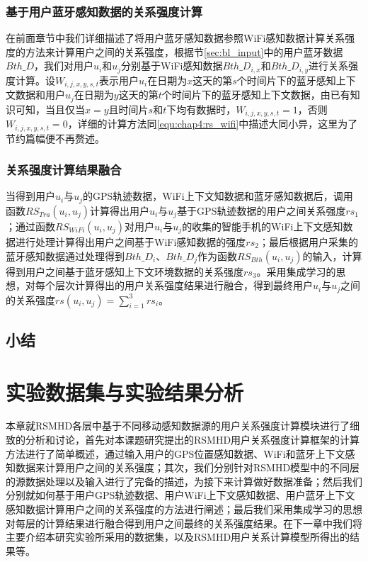 \subsection{基于用户蓝牙感知数据的关系强度计算}
在前面章节中我们详细描述了将用户蓝牙感知数据参照WiFi感知数据计算关系强度的方法来计算用户之间的关系强度，根据节\ref{sec:bl_input}中的用户蓝牙数据$Bth\_D$，我们对用户$u_{i}$和$u_{j}$分别基于WiFi感知数据$Bth\_D_{i,x}$和$Bth\_D_{i,y}$进行关系强度计算。设$W_{i,j,x,y,s,t}$表示用户$u_{i}$在日期为$x$这天的第$s$个时间片下的蓝牙感知上下文数据和用户$u_{j}$在日期为$y$这天的第$t$个时间片下的蓝牙感知上下文数据，由已有知识可知，当且仅当$x=y$且时间片$s$和$t$下均有数据时，$W_{i,j,x,y,s,t}=1$，否则$W_{i,j,x,y,s,t}=0$，详细的计算方法同\ref{equ:chap4:rs_wifi}中描述大同小异，这里为了节约篇幅便不再赘述。
\subsection{关系强度计算结果融合}
当得到用户$u_{i}$与$u_{j}$的GPS轨迹数据，WiFi上下文知数据和蓝牙感知数据后，调用函数$RS_{Tra}(u_{i},u_{j})$计算得出用户$u_{i}$与$u_{j}$基于GPS轨迹数据的用户之间关系强度$rs_{1}$；通过函数$RS_{WiFi}(u_{i},u_{j})$对用户$u_{i}$与$u_{j}$的收集的智能手机的WiFi上下文感知数据进行处理计算得出用户之间基于WiFi感知数据的强度$rs_{2}$；最后根据用户采集的蓝牙感知数据通过处理得到$Bth\_D_{i}$、$Bth\_D_{j}$作为函数$RS_{Bth}(u_{i},u_{j})$的输入，计算得到用户之间基于蓝牙感知上下文环境数据的关系强度$rs_{3}$。采用集成学习的思想，对每个层次计算得出的用户关系强度结果进行融合，得到最终用户$u_{i}$与$u_{j}$之间的关系强度$rs(u_{i},u_{j})=\sum_{i=1}^{3}rs_{i}$。
\clearpage
\section{小结}
\label{sec:section4-4}
\chapter{实验数据集与实验结果分析}
\label{chap:chapter03}
本章就RSMHD各层中基于不同移动感知数据源的用户关系强度计算模块进行了细致的分析和讨论，首先对本课题研究提出的RSMHD用户关系强度计算框架的计算方法进行了简单概述，通过输入用户的GPS位置感知数据、WiFi和蓝牙上下文感知数据来计算用户之间的关系强度；其次，我们分别针对RSMHD模型中的不同层的源数据处理以及输入进行了完备的描述，为接下来计算做好数据准备；然后我们分别就如何基于用户GPS轨迹数据、用户WiFi上下文感知数据、用户蓝牙上下文感知数据计算用户之间的关系强度的方法进行阐述；最后我们采用集成学习的思想对每层的计算结果进行融合得到用户之间最终的关系强度结果。在下一章中我们将主要介绍本研究实验所采用的数据集，以及RSMHD用户关系计算模型所得出的结果等。
